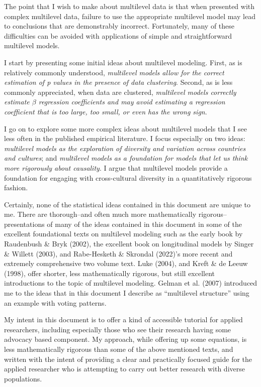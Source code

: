 \documentclass[
  letterpaper,
  DIV=11,
  numbers=noendperiod]{scrreprt}
\begin{document}
The point that I wish to make about multilevel data is that when
presented with complex multilevel data, failure to use the appropriate
multilevel model may lead to conclusions that are demonstrably
incorrect. Fortunately, many of these difficulties can be avoided with
applications of simple and straightforward multilevel models.

I start by presenting some initial ideas about multilevel modeling.
First, as is relatively commonly understood, \emph{multilevel models
allow for the correct estimation of p values in the presence of data
clustering}. Second, as is less commonly appreciated, when data are
clustered, \emph{multilevel models correctly estimate \(\beta\)
regression coefficients and may avoid estimating a regression
coefficient that is too large, too small, or even has the wrong sign}.

I go on to explore some more complex ideas about multilevel models that
I see less often in the published empirical literature. I focus
especially on two ideas: \emph{multilevel models as the exploration of
diversity and variation across countries and cultures}; and
\emph{multilevel models as a foundation for models that let us think
more rigorously about causality}. I argue that multilevel models provide
a foundation for engaging with cross-cultural diversity in a
quantitatively rigorous fashion.

Certainly, none of the statistical ideas contained in this document are
unique to me. There are thorough--and often much more mathematically
rigorous--presentations of many of the ideas contained in this document
in some of the excellent foundational texts on multilevel modeling such
as the early book by Raudenbush \& Bryk (2002), the excellent book on
longitudinal models by Singer \& Willett (2003), and Rabe-Hesketh \&
Skrondal (2022)'s more recent and extremely comprehensive two volume
text. Luke (2004), and Kreft \& de Leeuw (1998), offer shorter, less
mathematically rigorous, but still excellent introductions to the topic
of multilevel modeling. Gelman et al. (2007) introduced me to the ideas
that in this document I describe as ``multilevel structure'' using an
example with voting patterns.

My intent in this document is to offer a kind of accessible tutorial for
applied researchers, including especially those who see their research
having some advocacy based component. My approach, while offering up
some equations, is less mathematically rigorous than some of the above
mentioned texts, and written with the intent of providing a clear and
practically focused guide for the applied researcher who is attempting
to carry out better research with diverse populations.
\end{document}
